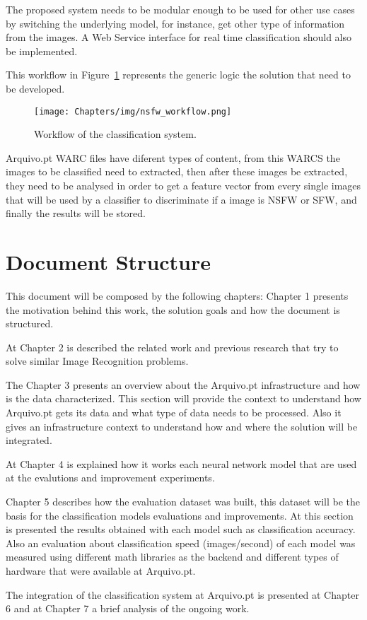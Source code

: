 The proposed system needs to be modular enough to be used for other use cases by switching the underlying model, for instance, get other type of information from the images. A Web Service interface for real time classification should also be implemented.

This workflow in Figure~\ref{fig:nsfw_workflow} represents the generic logic the solution that need to be developed.

\begin{figure}[H]
    \centering
    \texttt{[image: Chapters/img/nsfw\_workflow.png]}
    \vspace*{-10mm}
    \caption{Workflow of the classification system.}
    \label{fig:nsfw_workflow}
\end{figure}

Arquivo.pt WARC files have diferent types of content, from this WARCS the images to be classified need to extracted, then after these images be extracted, they need to be analysed in order to get a feature vector from every single images that will be used by a classifier to discriminate if a image is NSFW or SFW, and finally the results will be stored.


\section{Document Structure}

This document will be composed by the following chapters: Chapter 1 presents the motivation behind this work, the solution goals and how the document is structured. 

At Chapter 2 is described the related work and previous research that try to solve similar Image Recognition problems.

The Chapter 3 presents an overview about the Arquivo.pt infrastructure and how is the data characterized. This section will provide the context to understand how Arquivo.pt gets its data and what type of data needs to be processed. Also it gives an infrastructure context to understand how and where the solution will be integrated.


At Chapter 4 is explained how it works each neural network model that are used at the evalutions and improvement experiments.

Chapter 5 describes how the evaluation dataset was built, this dataset will be the basis for the classification models evaluations and improvements. At this section is presented the results obtained with each model such as classification accuracy. Also an evaluation about classification speed (images/second) of each model was measured using different math libraries as the backend and different types of hardware that were available at Arquivo.pt.

The integration of the classification system at Arquivo.pt is presented at Chapter 6 and at Chapter 7 a brief analysis of the ongoing work.





